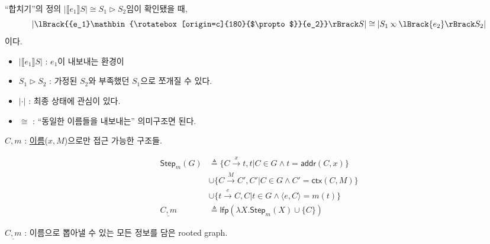 \documentclass[final]{beamer}
\newcommand*{\semlink}{\mathbin{\rotatebox[origin=c]{180}{$\propto$}}}
\newcommand*{\link}[2]{{#1}\semlink{#2}}
\newcommand*{\sembracket}[1]{\lBrack{#1}\rBrack}
\newcommand*{\addr}{\mathsf{addr}}
\newcommand*{\modctx}{\mathsf{ctx}}
\newlength{\colwidth}
\begin{document}
\begin{frame}[t]
\begin{columns}[t]
    \begin{column}{\colwidth}
      \begin{block}{``합치기''의 정의}
        $|\sembracket{e_1}S|\cong S_1\rhd S_2$임이 확인됐을 때,
        \[|\sembracket{\link{e_1}{e_2}}S|\cong|S_1\semlink\sembracket{e_2}S_2|\]이다.
        \begin{itemize}
          \item $|\sembracket{e_1}S|$ : $e_1$이 내보내는 환경이
          \item $S_1\rhd S_2$ : 가정된 $S_2$와 부족했던 $S_1$으로 쪼개질 수 있다.
          \item $|\cdot|$ : 최종 상태에 관심이 있다.
          \item $\cong$ : ``동일한 이름들을 내보내는'' 의미구조면 된다.
        \end{itemize}
        $C,m$ : \underline{이름}($x,M$)으로만 접근 가능한 구조들.
        \vspace{-1em}
        \begin{figure}[h!]
          \large
          \begin{align*}
            \mathsf{Step}_m(G) & \triangleq  \{C\xrightarrow{x}t,t|C\in G\wedge t=\addr(C,x)\}      \\
                               & \cup \{C\xrightarrow{M}C',C'|C\in G\wedge C'=\modctx(C,M)\}        \\
                               & \cup \{t\xrightarrow{e}C,C|t\in G\wedge \langle e,C \rangle=m(t)\} \\
            \underline{C,m}    & \triangleq \mathsf{lfp}(\lambda X.\mathsf{Step}_m(X)\cup\{C\})
          \end{align*}
        \end{figure}
        $\underline{C,m}$ : 이름으로 뽑아낼 수 있는 모든 정보를 담은 rooted graph.


\end{block}
\end{column}
\end{columns}
\end{frame}
\end{document}
